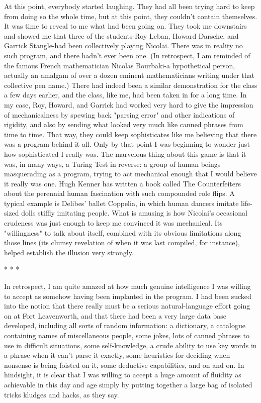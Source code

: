         At this point, everybody started laughing. They had all been trying hard to
keep from doing so the whole time, but at this point, they couldn't contain themselves.
It was time to reveal to me what had been going on. They took me downstairs and
showed me that three of the students-Roy Leban, Howard Darsche, and Garrick
Stangle-had been collectively playing Nicolai. There was in reality no such program,
and there hadn't ever been one. (In retrospect, I am reminded of the famous French
mathematician Nicolas Bourbaki-a hypothetical person, actually an amalgam of over
a dozen eminent mathematicians writing under that collective pen name.) There had
indeed been a similar demonstration for the class a few days earlier, and the class, like
me, had been taken in for a long time. In my case, Roy, Howard, and Garrick had
worked very hard to give the impression of mechanicalness by spewing back "parsing
error" and other indications of rigidity, and also by sending what looked very much
like canned phrases from time to time. That way, they could keep sophisticates like
me believing that there was a program behind it all. Only by that point I was
beginning to wonder just how sophisticated I really was.
        The marvelous thing about this game is that it was, in many ways, a Turing
Test in reverse: a group of human beings masquerading as a program, trying to act
mechanical enough that I would believe it really was one. Hugh Kenner has written a
book called The Counterfeiters about the perennial human fascination with such
compounded role flips. A typical example is Delibes' ballet Coppelia, in which human
dancers imitate life-sized dolls stiffly imitating people. What is amusing is how
Nicolai's occasional crudeness was just enough to keep me convinced it was
mechanical. Its "willingness" to talk about itself, combined with its obvious
limitations along those lines (its clumsy revelation of when it was last compiled, for
instance), helped establish the illusion very strongly.

                                       *   *   *

        In retrospect, I am quite amazed at how much genuine intelligence I was
willing to accept as somehow having been implanted in the program. I had been
sucked into the notion that there really must be a serious natural-language effort going
on at Fort Leavenworth, and that there had been a very large data base developed,
including all sorts of random information: a dictionary, a catalogue containing names
of miscellaneous people, some jokes, lots of canned phrases to use in difficult
situations, some self-knowledge, a crude ability to use key words in a phrase when it
can't parse it exactly, some heuristics for deciding when nonsense is being foisted on
it, some deductive capabilities, and on and on. In hindsight, it is clear that I was
willing to accept a huge amount of fluidity as achievable in this day and age simply
by putting together a large bag of isolated tricks kludges and hacks, as they say.




